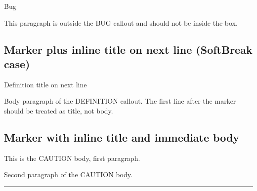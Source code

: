 \begin{tcolorbox}[breakable,colback=ocGryBack,colframe=ocGryFrame,coltitle=ocGryTitle,left=3mm,boxed title style={left=1mm},title={\hspace*{-2.5mm}\iconInfo\; md2pdf - inner with explicit \texttt{shift-heading=0}}]
\vspace{2mm}

\noindent\begin{tcolorbox}[colback=ocRed2Back,colframe=ocRed2Frame,coltitle=ocRed2Title,left=3mm,width=\linewidth,boxrule=0pt]

\hspace*{-2.5mm}\iconBug\; Bug

\end{tcolorbox}

This paragraph is outside the BUG callout and should not be inside the
box.

\subsection*{Marker plus inline title on next line (SoftBreak
case)}\label{inner-3-marker-plus-inline-title-on-next-line-softbreak-case}

\begin{tcolorbox}[breakable,colback=ocPinBack,colframe=ocPinFrame,coltitle=ocPinTitle,left=3mm,boxed title style={left=1mm},title={\hspace*{-2.5mm}\iconDefinition\; Definition}]

Definition title on next line

Body paragraph of the DEFINITION callout. The first line after the
marker should be treated as title, not body.

\end{tcolorbox}

\subsection*{Marker with inline title and immediate
body}\label{inner-3-marker-with-inline-title-and-immediate-body}

\begin{tcolorbox}[breakable,colback=ocOrgBack,colframe=ocOrgFrame,coltitle=ocOrgTitle,left=3mm,boxed title style={left=1mm},title={\hspace*{-2.5mm}\iconWarning\; Caution title}]

This is the CAUTION body, first paragraph.

Second paragraph of the CAUTION body.

\end{tcolorbox}

\begin{center}\rule{0.5\linewidth}{0.5pt}\end{center}


\end{tcolorbox}
